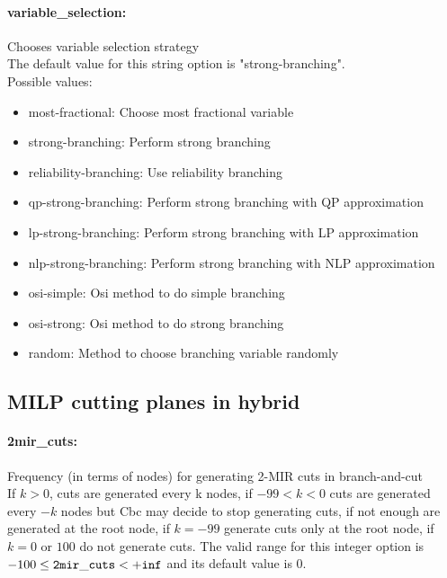 \paragraph{\bf variable\_selection:}\label{sec:variable_selection} Chooses variable selection strategy $\;$ \\

The default value for this string option is "strong-branching".
\\ 
Possible values:
\begin{itemize}
   \item most-fractional: Choose most fractional variable
   \item strong-branching: Perform strong branching
   \item reliability-branching: Use reliability branching
   \item qp-strong-branching: Perform strong branching with QP approximation
   \item lp-strong-branching: Perform strong branching with LP approximation
   \item nlp-strong-branching: Perform strong branching with NLP approximation
   \item osi-simple: Osi method to do simple branching
   \item osi-strong: Osi method to do strong branching
   \item random: Method to choose branching variable randomly
\end{itemize}

\subsection{MILP cutting planes in hybrid}
\label{sec:MILP_cutting_planes_in_hybrid}
\paragraph{\bf 2mir\_cuts:}\label{sec:2mir_cuts} Frequency (in terms of nodes) for generating 2-MIR cuts in branch-and-cut $\;$ \\
 If $k > 0$, cuts are generated every k nodes, if
$-99 < k < 0$ cuts are generated every $-k$ nodes
but Cbc may decide to stop generating cuts, if
not enough are generated at the root node, if
$k=-99$ generate cuts only at the root node, if
$k=0$ or $100$ do not generate cuts. The valid range for this integer option is
$-100 \le {\tt 2mir\_cuts } <  {\tt +inf}$
and its default value is $0$.


